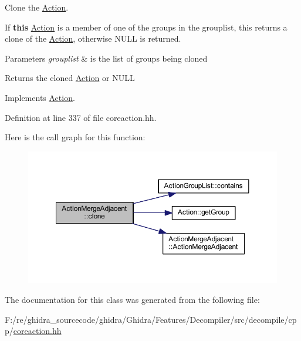 Clone the \mbox{\hyperlink{class_action}{Action}}. 

If {\bfseries{this}} \mbox{\hyperlink{class_action}{Action}} is a member of one of the groups in the grouplist, this returns a clone of the \mbox{\hyperlink{class_action}{Action}}, otherwise N\+U\+LL is returned. 
\begin{DoxyParams}{Parameters}
{\em grouplist} & is the list of groups being cloned \\
\hline
\end{DoxyParams}
\begin{DoxyReturn}{Returns}
the cloned \mbox{\hyperlink{class_action}{Action}} or N\+U\+LL 
\end{DoxyReturn}


Implements \mbox{\hyperlink{class_action_af8242e41d09e5df52f97df9e65cc626f}{Action}}.



Definition at line 337 of file coreaction.\+hh.

Here is the call graph for this function\+:
\nopagebreak
\begin{figure}[H]
\begin{center}
\leavevmode
\includegraphics[width=350pt]{class_action_merge_adjacent_af7ddb17ea086b27efa6461076a258c54_cgraph}
\end{center}
\end{figure}


The documentation for this class was generated from the following file\+:\begin{DoxyCompactItemize}
\item 
F\+:/re/ghidra\+\_\+sourcecode/ghidra/\+Ghidra/\+Features/\+Decompiler/src/decompile/cpp/\mbox{\hyperlink{coreaction_8hh}{coreaction.\+hh}}\end{DoxyCompactItemize}
